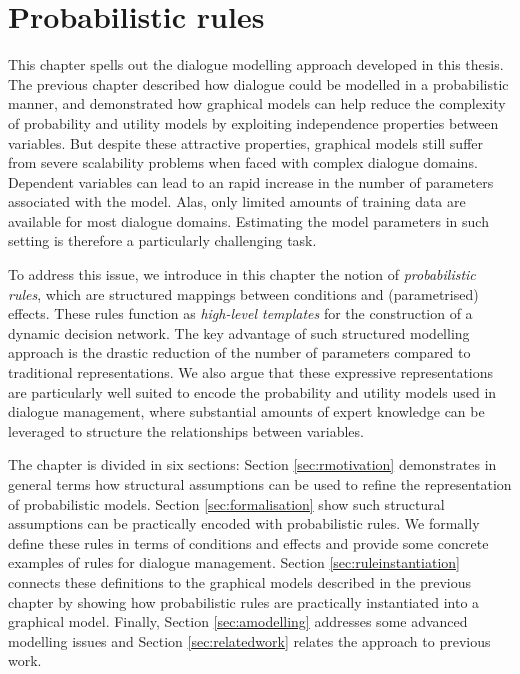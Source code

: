 \chapter{Probabilistic rules}
\label{chap:rules}

This chapter spells out the dialogue modelling approach developed in this thesis.  The previous chapter described how dialogue could be modelled in a probabilistic manner, and demonstrated how graphical models can help reduce the complexity of probability and utility models by exploiting independence properties between variables. But despite these attractive properties, graphical models still suffer from severe scalability problems when faced with complex dialogue domains.  Dependent variables can lead to an rapid increase in the number of parameters associated with the model. Alas, only limited amounts of training data are available for most dialogue domains.  Estimating the model parameters in such setting is therefore a particularly challenging task. 

To address this issue, we introduce in this chapter the notion of \textit{probabilistic rules}, which are structured mappings between conditions and  (parametrised) effects.  These rules function as \textit{high-level templates} for the construction of a dynamic decision network.  The key advantage of such structured modelling approach is the drastic reduction of the number of parameters compared to traditional representations.  We also argue that these expressive representations are particularly well suited to encode the probability and utility models used in dialogue management, where substantial amounts of expert knowledge can be leveraged to structure the relationships between variables. 

The chapter is divided in six sections:  Section \ref{sec:rmotivation} demonstrates in general terms how structural assumptions can be used to refine the representation of probabilistic models. Section \ref{sec:formalisation} show such structural assumptions can be practically encoded with probabilistic rules.  We formally define these rules in terms of conditions and effects and provide some concrete examples of rules for dialogue management.  Section \ref{sec:ruleinstantiation} connects these definitions to the graphical models described in the previous chapter by showing how probabilistic rules are practically instantiated into a graphical model.  Finally, Section \ref{sec:amodelling} addresses some advanced modelling issues and Section \ref{sec:relatedwork} relates the approach to previous work.


